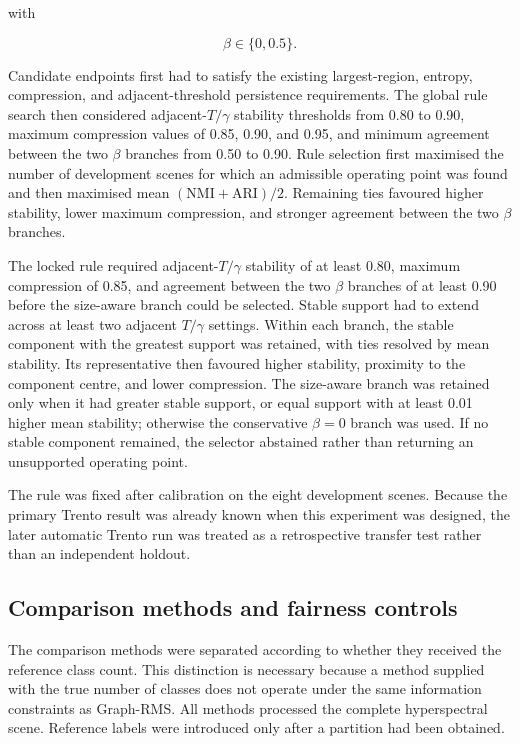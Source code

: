 \documentclass[10pt,a4paper,fleqn]{article}
\begin{document}
with

\begin{equation}
\beta\in\{0,0.5\}.
\label{eq:auto_beta_grid}
\end{equation}

Candidate endpoints first had to satisfy the existing largest-region, entropy,
compression, and adjacent-threshold persistence requirements. The global rule
search then considered adjacent-\(T/\gamma\) stability thresholds from 0.80
to 0.90, maximum compression values of 0.85, 0.90, and 0.95, and minimum
agreement between the two \(\beta\) branches from 0.50 to 0.90. Rule
selection first maximised the number of development scenes for which an
admissible operating point was found and then maximised mean
\((\mathrm{NMI}+\mathrm{ARI})/2\). Remaining ties favoured higher stability,
lower maximum compression, and stronger agreement between the two
\(\beta\) branches.

The locked rule required adjacent-\(T/\gamma\) stability of at least 0.80,
maximum compression of 0.85, and agreement between the two \(\beta\) branches
of at least 0.90 before the size-aware branch could be selected. Stable support
had to extend across at least two adjacent \(T/\gamma\) settings. Within each
branch, the stable component with the greatest support was retained, with ties
resolved by mean stability. Its representative then favoured higher stability,
proximity to the component centre, and lower compression. The size-aware
branch was retained only when it had greater stable support, or equal support
with at least 0.01 higher mean stability; otherwise the conservative
\(\beta=0\) branch was used. If no stable component remained, the selector
abstained rather than returning an unsupported operating point.

The rule was fixed after calibration on the eight development scenes. Because
the primary Trento result was already known when this experiment was designed,
the later automatic Trento run was treated as a retrospective transfer test
rather than an independent holdout.
\subsection{Comparison methods and fairness controls}
\label{subsec:baselines}

The comparison methods were separated according to whether they received the
reference class count. This distinction is necessary because a method supplied
with the true number of classes does not operate under the same information
constraints as Graph-RMS. All methods processed the complete hyperspectral
scene. Reference labels were introduced only after a partition had been
obtained.
\end{document}
